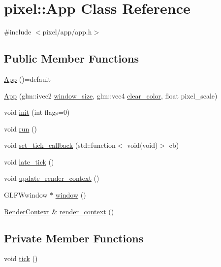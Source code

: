 \hypertarget{classpixel_1_1_app}{}\section{pixel\+:\+:App Class Reference}
\label{classpixel_1_1_app}


{\ttfamily \#include $<$pixel/app/app.\+h$>$}

\subsection*{Public Member Functions}
\begin{DoxyCompactItemize}
\item 
\hyperlink{classpixel_1_1_app_af4a37ad9c00effc7cec0c255e03d70c4}{App} ()=default
\item 
\hyperlink{classpixel_1_1_app_a6fe4a8f0d585fb46ef777b772f33ee23}{App} (glm\+::ivec2 \hyperlink{app_8cpp_a93e893499cf4f577c814afbfefcef91e}{window\+\_\+size}, glm\+::vec4 \hyperlink{app_8cpp_a5fbf4b63994b492e6d4db94742408254}{clear\+\_\+color}, float pixel\+\_\+scale)
\item 
void \hyperlink{classpixel_1_1_app_a493e02e59da4f855f150da197c7635d2}{init} (int flags=0)
\item 
void \hyperlink{classpixel_1_1_app_ae09dc71078b64c56c673b1ad1d25b5d1}{run} ()
\item 
void \hyperlink{classpixel_1_1_app_a4c827ea9bb9a1d9c23a191e3cd5c9fd7}{set\+\_\+tick\+\_\+callback} (std\+::function$<$ void(void)$>$ cb)
\item 
void \hyperlink{classpixel_1_1_app_aeb5bd2f5b647c6d72e41675bbee75582}{late\+\_\+tick} ()
\item 
void \hyperlink{classpixel_1_1_app_a6bb62cf2cbcc3c7d161a0f94a75da1eb}{update\+\_\+render\+\_\+context} ()
\item 
G\+L\+F\+Wwindow $\ast$ \hyperlink{classpixel_1_1_app_a301a9d2271ae3bbd841d46412aec533d}{window} ()
\item 
\hyperlink{structpixel_1_1_render_context}{Render\+Context} \& \hyperlink{classpixel_1_1_app_a9200e57d78569df68303c9556f9bad8a}{render\+\_\+context} ()
\end{DoxyCompactItemize}
\subsection*{Private Member Functions}
\begin{DoxyCompactItemize}
\item 
void \hyperlink{classpixel_1_1_app_a100f1ea74491859e329bf4396c2ac4c7}{tick} ()
\end{DoxyCompactItemize}
